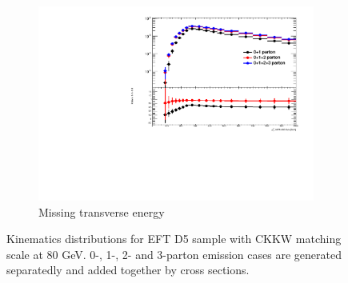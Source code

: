\begin{figure} [thbp]
\begin{subfigure}{0.48\linewidth}
    \includegraphics[width=\linewidth]{figures/monojet_appendix/h_pt2_MET250.pdf}
    \caption{Missing transverse energy}
  \end{subfigure}
  \caption{Kinematics distributions for EFT D5 sample with CKKW matching scale at 80 GeV. 0-, 1-, 2- and 3-parton emission cases are generated separatedly and added together by cross sections.}
  \label{fig:RatioKine_D5}
\end{figure}

